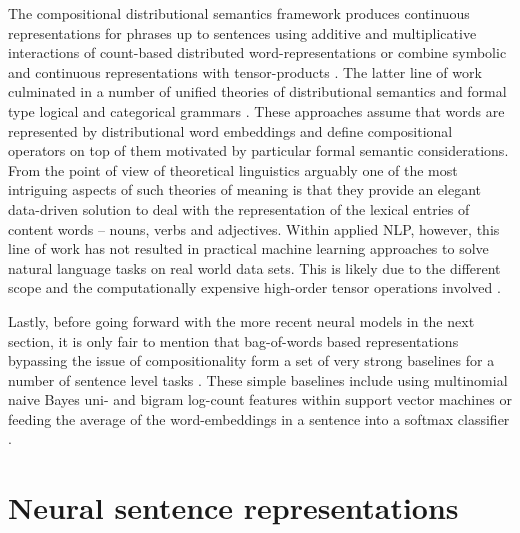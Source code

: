 The compositional distributional semantics  framework  produces
continuous representations for phrases up to sentences using additive and multiplicative interactions
of count-based distributed word-representations \citep{mitchell2008vector} or combine symbolic and
continuous representations with tensor-products \citep{clark2007combining}.
The latter line of work culminated in a number of unified theories of
distributional semantics and formal type logical and categorical grammars
\citep{coecke2010mathematical,clarke2012context,baroni2014frege}.
These approaches assume that words are represented by distributional word embeddings
and define compositional operators on top of them motivated by particular formal
semantic considerations. From the point of view of theoretical linguistics arguably
one of the most intriguing aspects of such theories of meaning is that
they provide an elegant data-driven solution to deal with the representation of the lexical entries of
content words -- nouns, verbs and adjectives.
Within applied NLP, however, this line of work has not resulted in
practical machine learning approaches to solve natural language tasks
on real world data sets. This is likely due to the different scope and
the computationally expensive high-order
tensor operations involved \citep{bowman2016modeling}.

Lastly, before going forward with the more recent neural models in the next section,
it is only fair to mention that bag-of-words
based representations bypassing the issue of compositionality form a set of very strong baselines
for a number of sentence level tasks \citep{hill2016learning}.
These simple baselines include using multinomial naive Bayes uni- and bigram
log-count features within support vector machines \citep{wang2012baselines} or
feeding the average of the word-embeddings in a sentence into a softmax classifier \citep{joulin2016bag}.


\section{Neural sentence representations}
\label{sec:trans-sentence}

